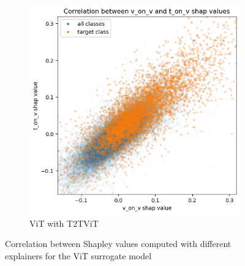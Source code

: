 \documentclass[magisterska,en]{pracamgr}
\begin{document}
\begin{figure}
\begin{subfigure}{.445\textwidth}
  \centering
  \includegraphics[width=1\linewidth]{./images/v_and_t_on_vit.png}
  \caption{ViT with T2T\textunderscore ViT }
\end{subfigure}


\caption{Correlation between Shapley values computed with different explainers for the ViT surrogate model}
\label{fig:Pairs Shapley correlation}
\end{figure}
\end{document}
